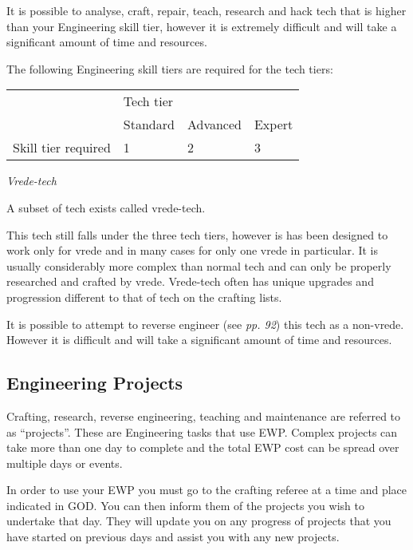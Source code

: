 It is possible to analyse, craft, repair, teach, research and hack tech that is higher than your Engineering skill tier, however it is extremely difficult and will take a significant amount of time and resources.

The following Engineering skill tiers are required for the tech tiers:

\begin{table}
\begin{tabular}{|l|l|l|l|} \hline 
\multirow{1}{*}{}& \multicolumn{3}{|l|}{Tech tier} \\
\cline{2-2}\cline{3-3}\cline{4-4} & Standard & Advanced & Expert \\
 \hline Skill tier required & 1 & 2 & 3 \\
 \hline \end{tabular}

\end{table}

\textit{Vrede-tech}

A subset of tech exists called vrede-tech.

This tech still falls under the three tech tiers, however is has been designed to work only for vrede and in many cases for only one vrede in particular. It is usually considerably more complex than normal tech and can only be properly researched and crafted by vrede. Vrede-tech often has unique upgrades and progression different to that of tech on the crafting lists.

It is possible to attempt to reverse engineer (see \textit{pp. 92}) this tech as a non-vrede. However it is difficult and will take a significant amount of time and resources.

\subsection{Engineering Projects}

Crafting, research, reverse engineering, teaching and maintenance are referred to as ``projects''. These are Engineering tasks that use EWP. Complex projects can take more than one day to complete and the total EWP cost can be spread over multiple days or events.

In order to use your EWP you must go to the crafting referee at a time and place indicated in GOD. You can then inform them of the projects you wish to undertake that day. They will update you on any progress of projects that you have started on previous days and assist you with any new projects.

